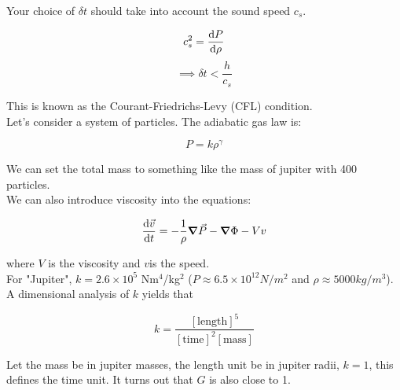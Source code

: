 \documentclass[]{article}
\begin{document}
Your choice of $\delta t$ should take into account the sound speed $c_s$.

\[c_s^2 = \dv{P}{\rho}\]
\[\implies \delta t < \frac{h}{c_s}\]

This is known as the Courant-Friedrichs-Levy (CFL) condition.\\

Let's consider a system of particles. The adiabatic gas law is:

\[P = k\rho^\gamma\]

We can set the total mass to something like the mass of jupiter with 400 particles.\\

We can also introduce viscosity into the equations:

\[\dv{\vec{v}}{t} = -\frac{1}{\rho}\grad{\vec{P}} - \grad{\Phi} - Vv\]

where $V$ is the viscosity and $v$is the speed.\\

For "Jupiter", $k = 2.6 \times 10^5$ Nm$^4$/kg$^2$ ($P \approx 6.5 \times 10^12 N/m^2$ and $\rho \approx 5000 kg/m^3$). \\

A dimensional analysis of $k$ yields that 

\[k = \frac{[\text{length}]^5}{[\text{time}]^2[\text{mass}]}\]

Let the mass be in jupiter masses, the length unit be in jupiter radii, $k = 1$, this defines the time unit. It turns out that $G$ is also close to 1.\\

 
\end{document}
